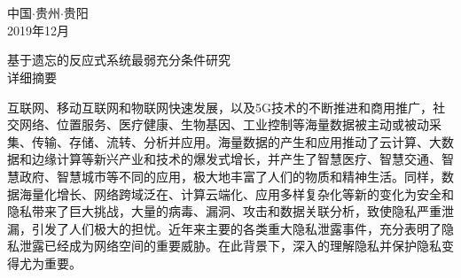 \documentclass[pdftex,notypeinfo,twoside,openany,UTF8,fntef]{CASthesis}
\theoremstyle{THrm}{
	\newtheorem{question}{Question}[section]
	\newtheorem{property}{性质}[section]
	\newtheorem{assumption}{假设}[section]
	\newtheorem{claim}[lemma]{断言}
	
}
\begin{document}

  \titlepage
  \newpage\thispagestyle{empty}


  \vspace*{10pt}
  \begin{center}
   	\heiti{}\\
   	\heiti{}\\
   	\heiti{}
  \end{center}

  \vspace*{80pt}
  \begin{center}
  	\heiti{}
  \end{center}

  \vspace*{130pt}
  \begin{center}
  	\heiti{}
  \end{center}

  \vspace*{40pt}

  \begin{center}
  	\heiti{}
  	{中国$\cdot$贵州$\cdot$贵阳\\2019年12月}
  \end{center}


\newpage
\pagestyle{plain}
\begin{center}
	\heiti{}
	{基于遗忘的反应式系统最弱充分条件研究}\\
	\heiti{}
	{详细摘要}
\end{center}

互联网、移动互联网和物联网快速发展，以及5G技术的不断推进和商用推广，社交网络、位置服务、医疗健康、生物基因、工业控制等海量数据被主动或被动采集、传输、存储、流转、分析并应用。海量数据的产生和应用推动了云计算、大数据和边缘计算等新兴产业和技术的爆发式增长，并产生了智慧医疗、智慧交通、智慧政府、智慧城市等不同的应用，极大地丰富了人们的物质和精神生活。同样，数据海量化增长、网络跨域泛在、计算云端化、应用多样复杂化等新的变化为安全和隐私带来了巨大挑战，大量的病毒、漏洞、攻击和数据关联分析，致使隐私严重泄漏，引发了人们极大的担忧。近年来主要的各类重大隐私泄露事件，充分表明了隐私泄露已经成为网络空间的重要威胁。在此背景下，深入的理解隐私并保护隐私变得尤为重要。
\end{document}
